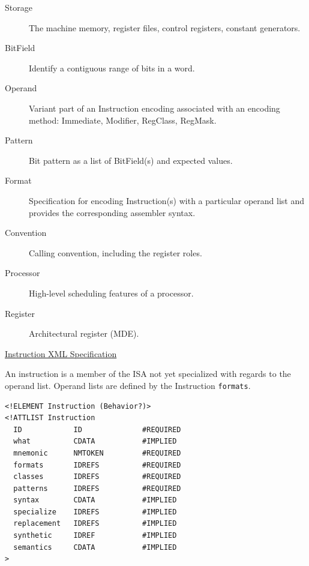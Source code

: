 \documentclass[a4]{seminar}
\begin{document}
\begin{slide}


\begin{description}

\item[Storage] The machine memory, register files, control registers, constant generators.

\item[BitField] Identify a contiguous range of bits in a word.

\item[Operand] Variant part of an Instruction encoding associated with an
encoding method: Immediate, Modifier, RegClass, RegMask.

\item[Pattern] Bit pattern as a list of BitField(s) and expected values.

\item[Format] Specification for encoding Instruction(s) with a particular
operand list and provides the corresponding assembler syntax.

\item[Convention] Calling convention, including the register roles.

\item[Processor] High-level scheduling features of a processor.

\item[Register] Architectural register (MDE).

\end{description}

\end{slide}


\begin{slide}

\begin{center} \underline{Instruction XML Specification} \end{center}

An instruction is a member of the ISA not yet specialized with regards to the
operand list. Operand lists are defined by the Instruction \texttt{formats}.

{\scriptsize
\begin{verbatim}
<!ELEMENT Instruction (Behavior?)>
<!ATTLIST Instruction
  ID            ID              #REQUIRED
  what          CDATA           #IMPLIED
  mnemonic      NMTOKEN         #REQUIRED
  formats       IDREFS          #REQUIRED
  classes       IDREFS          #REQUIRED
  patterns      IDREFS          #REQUIRED
  syntax        CDATA           #IMPLIED
  specialize    IDREFS          #IMPLIED
  replacement   IDREFS          #IMPLIED
  synthetic     IDREF           #IMPLIED
  semantics     CDATA           #IMPLIED
>
\end{verbatim}
}

\end{slide}
\end{document}
